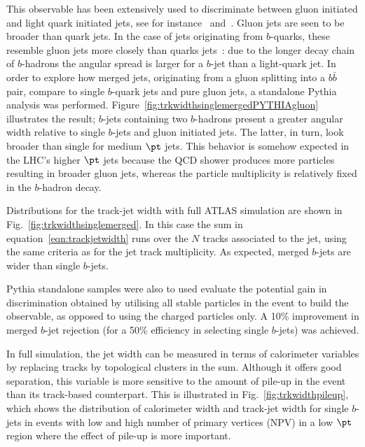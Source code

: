 This observable has been extensively used to discriminate between gluon initiated and light quark initiated jets, see for instance~\cite{PhysRevLett.107.172001} and~\cite{ATLAS-CONF-2011-053}. Gluon jets are seen to be broader than quark jets. In the case of jets originating from $b$-quarks, these resemble gluon jets more closely than quarks jets~\cite{Buskulic1996353}: due to the longer decay chain of $b$-hadrons the angular spread is larger for a $b$-jet than a light-quark jet. In order to explore how merged jets, originating from a gluon splitting into a $b\bar{b}$ pair, compare to single $b$-quark jets and pure gluon jets,  a standalone {\sc Pythia} analysis was performed.  Figure~\ref{fig:trkwidthsinglemergedPYTHIAgluon} illustrates the result; $b$-jets containing two $b$-hadrons present a greater angular width relative to single $b$-jets and gluon initiated jets. The latter, in turn, look broader than single for medium $\pt$ jets. This behavior is somehow expected in the LHC's higher $\pt$ jets because the QCD shower produces more particles resulting in broader gluon jets,  whereas the particle multiplicity is relatively fixed in the $b$-hadron decay.

Distributions for the track-jet width with full ATLAS simulation are shown in Fig.~\ref{fig:trkwidthsinglemerged}. In this case %
the sum in equation~\ref{eqn:trackjetwidth} runs over the $N$ tracks associated to the jet, using the same criteria as for the jet track multiplicity. As expected, merged $b$-jets are wider than single $b$-jets. 

{\sc Pythia} standalone samples were also to used evaluate the potential gain in discrimination obtained by utilising all stable particles in the event to build the observable, as opposed to using the charged particles only.  A 10\% %
 improvement in merged $b$-jet rejection (for a 50\% efficiency in selecting single $b$-jets) was achieved.

In full simulation, the jet width can be measured in terms of calorimeter variables by replacing tracks by topological clusters in the sum.  Although it offers good separation, this variable is more sensitive to the amount of pile-up in the event than its track-based counterpart. This is illustrated in Fig.~\ref{fig:trkwidthpileup}, which shows the distribution of calorimeter width and track-jet width for single $b$-jets in events with low and high number of primary vertices (NPV) in a low $\pt$ region where the effect of pile-up is more important. 

